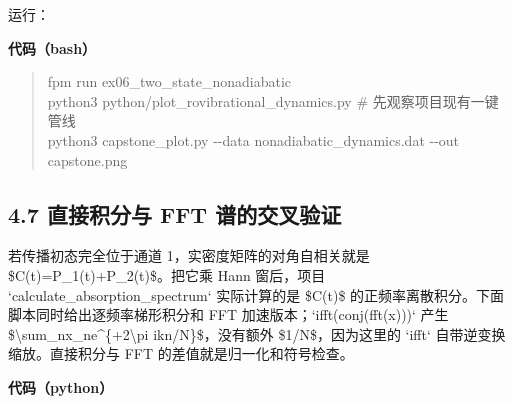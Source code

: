 \documentclass[UTF8,openany,11pt,fontset=fandol]{ctexbook}
\begin{document}
运行：

\textbf{代码（bash）}

\begin{quote}
fpm run ex06\_two\_state\_nonadiabatic\\
python3 python/plot\_rovibrational\_dynamics.py \#
先观察项目现有一键管线\\
python3 capstone\_plot.py -\/-data nonadiabatic\_dynamics.dat -\/-out
capstone.png
\end{quote}

\subsection{\texorpdfstring{\textbf{4.7 直接积分与 FFT
谱的交叉验证}}{4.7 直接积分与 FFT 谱的交叉验证}}\label{ux76f4ux63a5ux79efux5206ux4e0e-fft-ux8c31ux7684ux4ea4ux53c9ux9a8cux8bc1}

若传播初态完全位于通道 1，实密度矩阵的对角自相关就是
\$C(t)=P\_1(t)+P\_2(t)\$。把它乘 Hann 窗后，项目
`calculate\_absorption\_spectrum` 实际计算的是 \$C(t)\$
的正频率离散积分。下面脚本同时给出逐频率梯形积分和 FFT
加速版本；`ifft(conj(fft(x)))` 产生
\$\textbackslash sum\_nx\_ne\^{}\{+2\textbackslash pi
ikn/N\}\$，没有额外 \$1/N\$，因为这里的 `ifft`
自带逆变换缩放。直接积分与 FFT 的差值就是归一化和符号检查。

\textbf{代码（python）}
\end{document}
